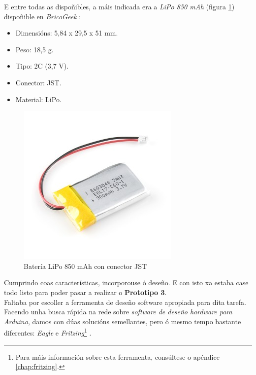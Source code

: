   E entre todas as dispoñibles, a máis indicada era a \textit{LiPo 850 mAh}
  (figura \ref{figura:LiPo}) dispoñible en \textit{BricoGeek} \cite{LiPo}:

  \begin{itemize}
   \item Dimensións: 5,84 x 29,5 x 51 mm.
   \item Peso: 18,5 g.
   \item Tipo: 2C (3,7 V).
   \item Conector: JST.
   \item Material: LiPo.
  \end{itemize}

  \begin{figure}[htbp]
   \centering
   \includegraphics[scale=0.6,keepaspectratio=true]{./imagenes/lipo.jpg}
   \caption{Batería LiPo 850 mAh con conector JST}
   \label{figura:LiPo}
  \end{figure}

  Cumprindo coas características, incorporouse ó deseño. E con isto xa estaba
  case todo listo para poder pasar a realizar o \textbf{Prototipo 3}. \\

  Faltaba por escoller a ferramenta de deseño software apropiada para dita
  tarefa. Facendo unha busca rápida na rede sobre
  \textit{software de deseño hardware para Arduino}, damos con dúas solucións
  semellantes, pero ó mesmo tempo bastante diferentes: \textit{Eagle}
  \cite{Eagle} e \textit{Fritzing}\footnote{Para máis información sobre esta
  ferramenta, consúltese o apéndice \ref{chap:fritzing}.} \cite{Fritzing}.

